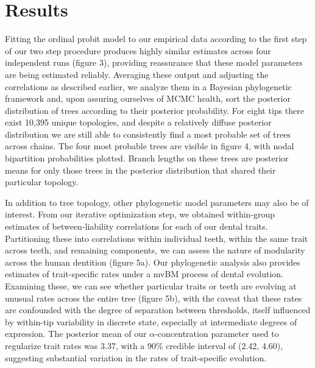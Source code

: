\documentclass[12pt, twocolumn, twoside]{article}
\begin{document}
\clearpage

\section*{Results}

Fitting the ordinal probit model to our empirical data according to the first step of our two step procedure produces highly similar estimates across four independent runs (figure 3), providing reassurance that these model parameters are being estimated reliably. Averaging these output and adjusting the correlations as described earlier, we analyze them in a Bayesian phylogenetic framework and, upon assuring ourselves of MCMC health, sort the posterior distribution of trees according to their posterior probability. For eight tips there exist 10,395 unique topologies, and despite a relatively diffuse posterior distribution we are still able to consistently find a most probable set of trees across chains. The four most probable trees are visible in figure 4, with nodal bipartition probabilities plotted. Branch lengths on these trees are posterior means for only those trees in the posterior distribution that shared their particular topology. 


In addition to tree topology, other phylogenetic model parameters may also be of interest. From our iterative optimization step, we obtained within-group estimates of between-liability correlations for each of our dental traits. Partitioning these into correlations within individual teeth, within the same trait across teeth, and remaining components, we can assess the nature of modularity across the human dentition (figure 5a). Our phylogenetic analysis also provides estimates of trait-specific rates under a mvBM process of dental evolution. Examining these, we can see whether particular traits or teeth are evolving at unusual rates across the entire tree (figure 5b), with the caveat that these rates are confounded with the degree of separation between thresholds, itself influenced by within-tip variability in discrete state, especially at intermediate degrees of expression. The posterior mean of our $\alpha$-concentration parameter used to regularize trait rates was 3.37, with a 90\% credible interval of (2.42, 4.60), suggesting substantial variation in the rates of trait-specific evolution.
\end{document}
